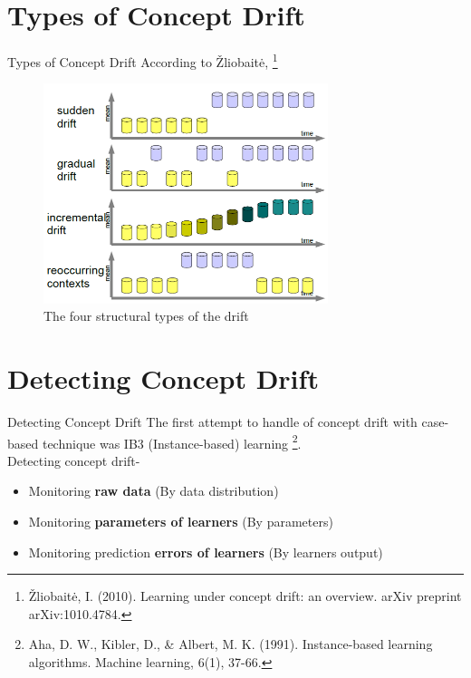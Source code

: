 \documentclass[10pt]{beamer}
\begin{document}
\section{Types of Concept Drift}
\begin{frame}{Types of Concept Drift}
According to Žliobaitė, \footnote{Žliobaitė, I. (2010). Learning under concept drift: an overview. arXiv preprint arXiv:1010.4784.}
\begin{figure}[ht]
  \begin{center}
  \includegraphics[width=8.3cm]{TypesofConceptDrift.png}
  \end{center}
  \caption{The four structural types of the drift}
  \label{tahapan_2}
\end{figure}
\end{frame}
\section{Detecting Concept Drift}
\begin{frame}{Detecting Concept Drift}
The first attempt to handle of concept drift with case-based technique was IB3 (Instance-based) learning \footnote{Aha, D. W., Kibler, D., \& Albert, M. K. (1991). Instance-based learning algorithms. Machine learning, 6(1), 37-66.}.\\
Detecting concept drift-
\begin{itemize}
    \item Monitoring \textbf{raw data} (By data distribution)
    \item Monitoring \textbf{parameters of learners} (By parameters)
    \item Monitoring prediction \textbf{errors of learners} (By learners output)
\end{itemize}
\end{frame}

\end{document}
